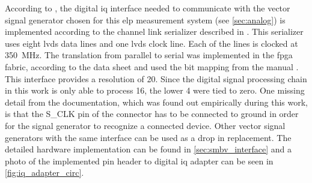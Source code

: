 \documentclass[12pt,a4paper,parskip=full,abstract=true,BCOR=12mm,twoside,open=right]{scrreprt}
\begin{document}
According to \cite{fsq_b17}, the digital \gls{iq} interface needed to communicate
with the vector signal generator chosen for this \gls{elp} measurement
system (see \cref{sec:analog}) is implemented according to the channel link serializer described in \cite{ds90cr485}. This
serializer uses eight \gls{lvds} data lines and one \gls{lvds} clock line. Each of the lines
is clocked at \SI{350}{\mega\hertz}. The translation from parallel to serial was implemented
in the \gls{fpga} fabric, according to the data sheet \cite{ds90cr485} and used
the bit mapping from the manual \cite{fsq_b17}. This interface provides a resolution of \SI{20}{\bit}.
Since the digital signal processing chain in this work is only able to process \SI{16}{\bit},
the lower \SI{4}{\bit} were tied to zero. One missing detail from the documentation,
which was found out empirically during this work, is that the S\_CLK pin of the connector
has to be connected to ground in order for the signal generator to recognize a connected
device. Other vector signal generators with the same interface can be used as a drop in
replacement. The detailed hardware implementation can be found in \cref{sec:smbv_interface} and
a photo of the implemented pin header to digital \gls{iq} adapter can be seen in \cref{fig:iq_adapter_circ}.
\end{document}
